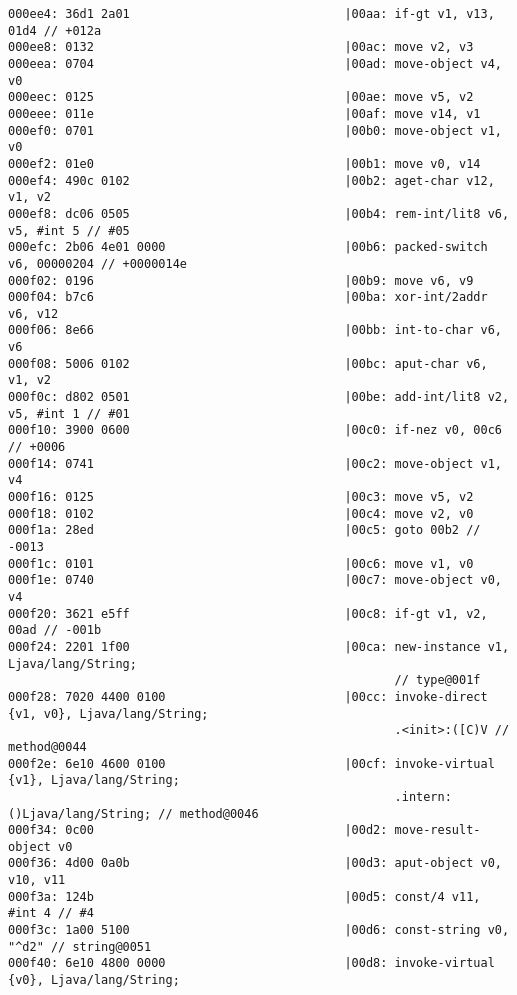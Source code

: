 \begin{lstlisting}
000ee4: 36d1 2a01                              |00aa: if-gt v1, v13, 01d4 // +012a
000ee8: 0132                                   |00ac: move v2, v3
000eea: 0704                                   |00ad: move-object v4, v0
000eec: 0125                                   |00ae: move v5, v2
000eee: 011e                                   |00af: move v14, v1
000ef0: 0701                                   |00b0: move-object v1, v0
000ef2: 01e0                                   |00b1: move v0, v14
000ef4: 490c 0102                              |00b2: aget-char v12, v1, v2
000ef8: dc06 0505                              |00b4: rem-int/lit8 v6, v5, #int 5 // #05
000efc: 2b06 4e01 0000                         |00b6: packed-switch v6, 00000204 // +0000014e
000f02: 0196                                   |00b9: move v6, v9
000f04: b7c6                                   |00ba: xor-int/2addr v6, v12
000f06: 8e66                                   |00bb: int-to-char v6, v6
000f08: 5006 0102                              |00bc: aput-char v6, v1, v2
000f0c: d802 0501                              |00be: add-int/lit8 v2, v5, #int 1 // #01
000f10: 3900 0600                              |00c0: if-nez v0, 00c6 // +0006
000f14: 0741                                   |00c2: move-object v1, v4
000f16: 0125                                   |00c3: move v5, v2
000f18: 0102                                   |00c4: move v2, v0
000f1a: 28ed                                   |00c5: goto 00b2 // -0013
000f1c: 0101                                   |00c6: move v1, v0
000f1e: 0740                                   |00c7: move-object v0, v4
000f20: 3621 e5ff                              |00c8: if-gt v1, v2, 00ad // -001b
000f24: 2201 1f00                              |00ca: new-instance v1, Ljava/lang/String;
                                                      // type@001f
000f28: 7020 4400 0100                         |00cc: invoke-direct {v1, v0}, Ljava/lang/String;
                                                      .<init>:([C)V // method@0044
000f2e: 6e10 4600 0100                         |00cf: invoke-virtual {v1}, Ljava/lang/String;
                                                      .intern:()Ljava/lang/String; // method@0046
000f34: 0c00                                   |00d2: move-result-object v0
000f36: 4d00 0a0b                              |00d3: aput-object v0, v10, v11
000f3a: 124b                                   |00d5: const/4 v11, #int 4 // #4
000f3c: 1a00 5100                              |00d6: const-string v0, "^d2" // string@0051
000f40: 6e10 4800 0000                         |00d8: invoke-virtual {v0}, Ljava/lang/String;

\end{lstlisting}
